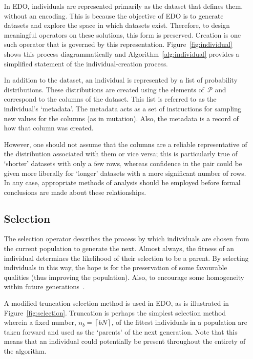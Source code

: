 In EDO, individuals are represented primarily as the dataset that defines them,
without an encoding. This is because the objective of EDO is to generate
datasets and explore the space in which datasets exist. Therefore, to design
meaningful operators on these solutions, this form is preserved. Creation is one
such operator that is governed by this representation.
Figure~\ref{fig:individual} shows this process diagrammatically and
Algorithm~\ref{alg:individual} provides a simplified statement of the
individual-creation process.

In addition to the dataset, an individual is represented by a list of
probability distributions. These distributions are created using the elements
of~\(\mathcal{P}\) and correspond to the columns of the dataset. This list is
referred to as the individual's `metadata'. The metadata acts as a set of
instructions for sampling new values for the columns (as in mutation). Also, the
metadata is a record of how that column was created.

However, one should not assume that the columns are a reliable representative of
the distribution associated with them or vice versa; this is particularly true
of `shorter' datasets with only a few rows, whereas confidence in the pair could
be given more liberally for `longer' datasets with a more significant number of
rows. In any case, appropriate methods of analysis should be employed before
formal conclusions are made about these relationships.



\subsection{Selection}

The selection operator describes the process by which individuals are chosen
from the current population to generate the next. Almost always, the fitness of
an individual determines the likelihood of their selection to be a parent. By
selecting individuals in this way, the hope is for the preservation of some
favourable qualities (thus improving the population). Also, to encourage some
homogeneity within future generations~\cite{Back1994}.


A modified truncation selection method is used in EDO, as is illustrated in
Figure~\ref{fig:selection}. Truncation is perhaps the simplest selection method
wherein a fixed number, \(n_b = \left\lceil b N\right\rceil\), of the fittest
individuals in a population are taken forward and used as the `parents' of the
next generation. Note that this means that an individual could potentially be
present throughout the entirety of the algorithm.

